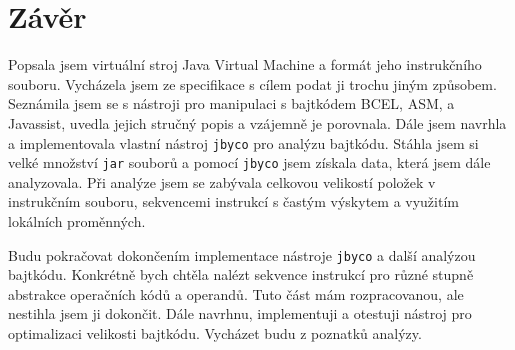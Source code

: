 \chapter{Závěr}\label{Conclusion}


Popsala jsem virtuální stroj Java Virtual Machine a formát jeho instrukčního souboru. Vycházela jsem ze specifikace \cite{Lindholm:JVM} s cílem podat ji trochu jiným způsobem. Seznámila jsem se s nástroji pro manipulaci s bajtkódem BCEL, ASM, a Javassist, uvedla jejich stručný popis a vzájemně je porovnala. Dále jsem navrhla a implementovala vlastní nástroj \texttt{jbyco} pro analýzu bajtkódu. Stáhla jsem si velké množství \texttt{jar} souborů a pomocí \texttt{jbyco} jsem získala data, která jsem dále analyzovala. Při analýze jsem se zabývala celkovou velikostí položek v instrukčním souboru, sekvencemi instrukcí s častým výskytem a využitím lokálních proměnných.

Budu pokračovat dokončením implementace nástroje \texttt{jbyco} a další analýzou bajtkódu. Konkrétně bych chtěla nalézt sekvence instrukcí pro různé stupně abstrakce operačních kódů a operandů. Tuto část mám rozpracovanou, ale nestihla jsem ji dokončit. Dále navrhnu, implementuji a otestuji nástroj pro optimalizaci velikosti bajtkódu. Vycházet budu z poznatků analýzy.


